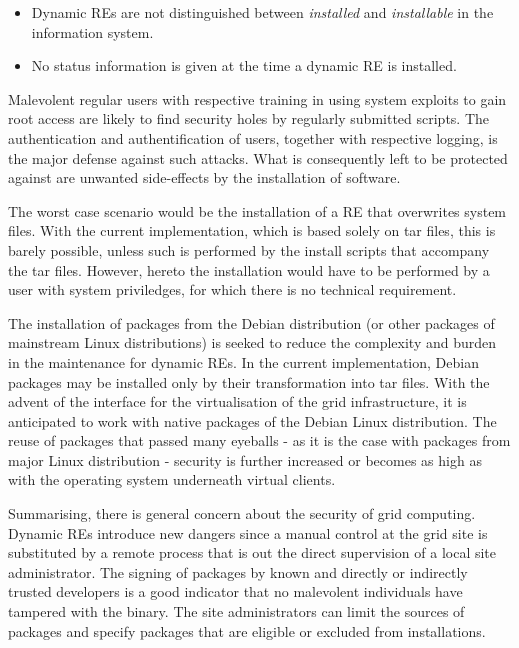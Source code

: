 \begin{itemize}
\item Dynamic REs are not distinguished between {\em installed} and
  {\em installable} in the information system.
\item No status information is given at the time a dynamic RE is installed.
\end{itemize}

Malevolent regular users with respective training in using system exploits
to gain root access are likely to find security holes by regularly
submitted scripts.  The authentication and authentification of users,
together with respective logging, is the major defense against such
attacks. What is consequently left to be protected against are unwanted
side-effects by the installation of software.

The worst case scenario would be the installation of a RE
that overwrites system files. With the current implementation, which is
based solely on tar files, this is barely possible, unless such is
performed by the install scripts that accompany the tar files. However,
hereto the installation would have to be performed by a user with system
priviledges, for which there is no technical requirement.

The installation of packages from the Debian distribution (or other
packages of mainstream Linux distributions) is seeked to reduce the
complexity and burden in the maintenance for dynamic REs. In the
current implementation, Debian packages may be installed only by their
transformation into tar files. With the advent of the interface for
the virtualisation of the grid infrastructure, it is anticipated to
work with native packages of the Debian Linux distribution. The reuse
of packages that passed many eyeballs - as it is the case with packages
from major Linux distribution - security is further increased or becomes
as high as with the operating system underneath virtual clients.

Summarising, there is general concern about the security of grid
computing.  Dynamic REs introduce new dangers since a
manual control at the grid site is substituted by a remote process that
is out the direct supervision of a local site administrator. The signing
of packages by known and directly or indirectly trusted developers is
a good indicator that no malevolent individuals have tampered with the
binary. The site administrators can limit the sources of packages and
specify packages that are eligible or excluded from installations.



% 
